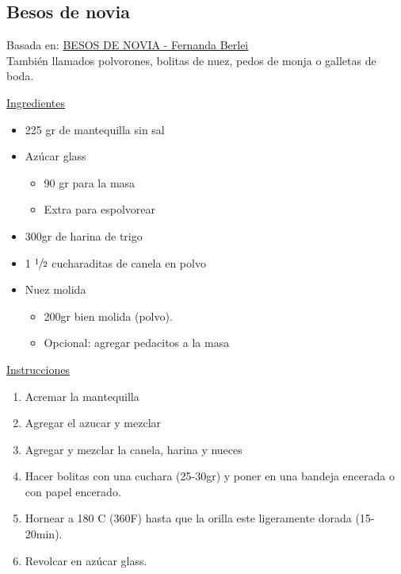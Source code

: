 \subsection{Besos de novia}

Basada en: \href{https://www.youtube.com/watch?v=V18ECzDqUjM}{BESOS DE NOVIA - Fernanda Berlei
} \\

También llamados polvorones, bolitas de nuez, pedos de monja o galletas de boda.

\underline{Ingredientes}

\begin{itemize}
\item 225 gr de mantequilla sin sal
\item Azúcar glass
\begin{itemize}
\item 90 gr para la masa
\item Extra para espolvorear
\end{itemize}
\item 300gr de harina de trigo
\item 1 $\sfrac{1}{2}$ cucharaditas de canela en polvo
\item Nuez molida
\begin{itemize}
\item 200gr bien molida (polvo).
\item Opcional: agregar pedacitos a la masa
\end{itemize}
\end{itemize}


\underline{Instrucciones}

\begin{enumerate}
\item Acremar la mantequilla
\item Agregar el azucar y mezclar
\item Agregar y mezclar la canela, harina y nueces
\item Hacer bolitas con una cuchara (25-30gr) y poner en una bandeja encerada o con papel encerado.
\item Hornear a 180 C (360F) hasta que la orilla este ligeramente dorada (15-20min).
\item Revolcar en azúcar glass.
\end{enumerate}

